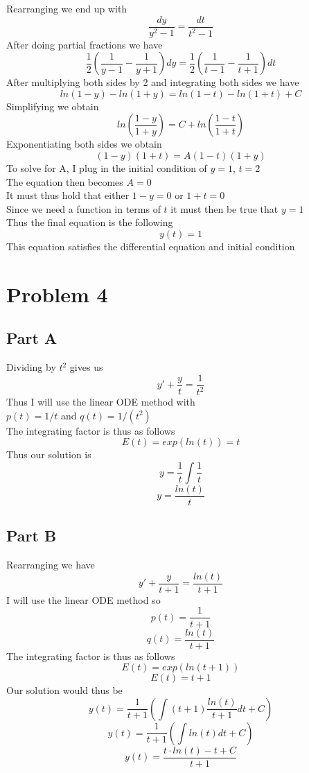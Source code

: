 \documentclass{article}
\begin{document}
Rearranging we end up with
\[
\frac{dy}{y^2-1} = \frac{dt}{t^2-1}
\]
After doing partial fractions we have
\[
\frac{1}{2}(\frac{1}{y-1} - \frac{1}{y+1})dy = \frac{1}{2}(\frac{1}{t-1} - \frac{1}{t+1})dt
\]
After multiplying both sides by 2 and integrating both sides we have
\[
ln(1-y) - ln(1+y) = ln(1-t) - ln(1+t) + C
\]
Simplifying we obtain
\[
ln(\frac{1-y}{1+y}) = C + ln(\frac{1-t}{1+t})
\]
Exponentiating both sides we obtain
\[
(1-y)(1+t) = A (1-t)(1+y)
\]
To solve for A, I plug in the initial condition of $y=1$, $t=2$\\
The equation then becomes $A=0$ \\
It must thus hold that either $1-y=0$ or $1+t=0$\\
Since we need a function in terms of $t$ it must then be true that $y=1$\\
Thus the final equation is the following
\[
y(t)=1
\]
This equation satisfies the differential equation and initial condition

\section{Problem 4}

\subsection{Part A}

Dividing by $t^2$ gives us
\[
y' + \frac{y}{t} = \frac{1}{t^2}
\]
Thus I will use the linear ODE method with\\
$p(t)=1/t$ and $q(t)=1/(t^2)$\\
The integrating factor is thus as follows
\[
E(t) = exp( ln(t)) = t
\]
Thus our solution is
\[
y = \frac{1}{t} \int \frac{1}{t}
\]
\[
y = \frac{ln(t)}{t}
\]

\subsection{Part B}

Rearranging we have
\[
y' + \frac{y}{t+1} = \frac{ln(t)}{t+1}
\]
I will use the linear ODE method so
\[
p(t) = \frac{1}{t+1}
\]
\[
q(t) = \frac{ln(t)}{t+1}
\]
The integrating factor is thus as follows
\[
E(t) = exp(ln(t+1))
\]
\[
E(t) = t+1
\]
Our solution would thus be
\[
y(t) = \frac{1}{t+1} (\int (t+1)\frac{ln(t)}{t+1}dt + C)
\]
\[
y(t) = \frac{1}{t+1} (\int ln(t)dt + C)
\]
\[
y(t) = \frac{t \cdot ln(t) - t + C}{t+1}
\]

\newpage
\end{document}
